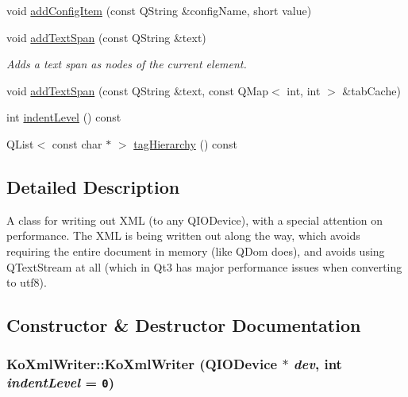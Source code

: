 \begin{CompactItemize}
\item 
void \hyperlink{classKoXmlWriter_517c0ff99e13b5f20df48b9b49bffcca}{addConfigItem} (const QString \&configName, short value)
\item 
void \hyperlink{classKoXmlWriter_c22324a2b86a2d5ed20026d9a47f353f}{addTextSpan} (const QString \&text)
\begin{CompactList}\small\item\em Adds a text span as nodes of the current element. \item\end{CompactList}\item 
void \hyperlink{classKoXmlWriter_609b2173ad0698a2f6f7a9b50beb5f0d}{addTextSpan} (const QString \&text, const QMap$<$ int, int $>$ \&tabCache)
\item 
int \hyperlink{classKoXmlWriter_71173772ef00a18d725d861cd409c0ad}{indentLevel} () const 
\item 
QList$<$ const char $\ast$ $>$ \hyperlink{classKoXmlWriter_9b3c63f244bbf41882ea76215b1be287}{tagHierarchy} () const 
\end{CompactItemize}


\subsection{Detailed Description}
A class for writing out XML (to any QIODevice), with a special attention on performance. The XML is being written out along the way, which avoids requiring the entire document in memory (like QDom does), and avoids using QTextStream at all (which in Qt3 has major performance issues when converting to utf8). 

\subsection{Constructor \& Destructor Documentation}
\hypertarget{classKoXmlWriter_533f9617e577fd34b4a4c7ad9fe23255}{
\subsubsection[{KoXmlWriter}]{\setlength{\rightskip}{0pt plus 5cm}KoXmlWriter::KoXmlWriter (QIODevice $\ast$ {\em dev}, \/  int {\em indentLevel} = {\tt 0})}}
\label{classKoXmlWriter_533f9617e577fd34b4a4c7ad9fe23255}


